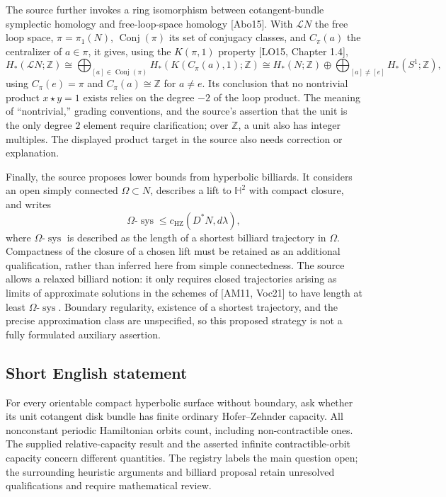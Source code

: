 \documentclass[11pt]{article}
\newcommand{\Z}{\mathbb{Z}}
\begin{document}
The source further invokes a ring isomorphism between cotangent-bundle symplectic homology and free-loop-space homology [Abo15]. With \(\mathcal L N\) the free loop space, \(\pi=\pi_1(N)\), \(\operatorname{Conj}(\pi)\) its set of conjugacy classes, and \(C_\pi(a)\) the centralizer of \(a\in\pi\), it gives, using the \(K(\pi,1)\) property [LO15, Chapter 1.4],
\[
H_*(\mathcal L N;\Z)\cong
\bigoplus_{[a]\in\operatorname{Conj}(\pi)}H_*(K(C_\pi(a),1);\Z)
\cong H_*(N;\Z)\oplus\bigoplus_{[a]\ne[e]}H_*(S^1;\Z),
\]
using \(C_\pi(e)=\pi\) and \(C_\pi(a)\cong\Z\) for \(a\ne e\). Its conclusion that no nontrivial product \(x\star y=1\) exists relies on the degree \(-2\) of the loop product. The meaning of ``nontrivial,'' grading conventions, and the source's assertion that the unit is the only degree \(2\) element require clarification; over \(\Z\), a unit also has integer multiples. The displayed product target in the source also needs correction or explanation.

Finally, the source proposes lower bounds from hyperbolic billiards. It considers an open simply connected \(\Omega\subset N\), describes a lift to \(\mathbb H^2\) with compact closure, and writes
\[
\Omega\text{-}\operatorname{sys}\leq c_{\mathrm{HZ}}(D^*N,d\lambda),
\]
where \(\Omega\text{-}\operatorname{sys}\) is described as the length of a shortest billiard trajectory in \(\Omega\). Compactness of the closure of a chosen lift must be retained as an additional qualification, rather than inferred here from simple connectedness. The source allows a relaxed billiard notion: it only requires closed trajectories arising as limits of approximate solutions in the schemes of [AM11, Voc21] to have length at least \(\Omega\text{-}\operatorname{sys}\). Boundary regularity, existence of a shortest trajectory, and the precise approximation class are unspecified, so this proposed strategy is not a fully formulated auxiliary assertion.
\subsection{Short English statement}
For every orientable compact hyperbolic surface without boundary, ask whether its unit cotangent disk bundle has finite ordinary Hofer--Zehnder capacity. All nonconstant periodic Hamiltonian orbits count, including non-contractible ones. The supplied relative-capacity result and the asserted infinite contractible-orbit capacity concern different quantities. The registry labels the main question open; the surrounding heuristic arguments and billiard proposal retain unresolved qualifications and require mathematical review.
\end{document}
